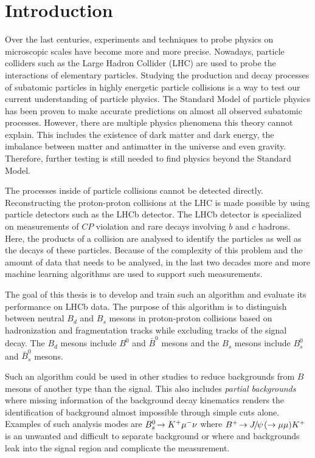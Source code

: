 \chapter{Introduction}

Over the last centuries, experiments and techniques to probe physics on microscopic scales have become more and more precise.
Nowadays, particle colliders such as the Large Hadron Collider (LHC) are used to probe the interactions of elementary particles.
Studying the production and decay processes of subatomic particles in highly energetic particle collisions is a way to test our current understanding of particle physics.
The Standard Model of particle physics has been proven to make accurate predictions on almost all observed subatomic processes.
However, there are multiple physics phenomena this theory cannot explain.
This includes the existence of dark matter and dark energy, the imbalance between matter and antimatter in the universe and even gravity.
Therefore, further testing is still needed to find physics beyond the Standard Model.

The processes inside of particle collisions cannot be detected directly.
Reconstructing the proton-proton collisions at the LHC is made possible by using particle detectors such as the LHCb detector.
The LHCb detector is specialized on measurements of $C\!P$ violation and rare decays involving $b$ and $c$ hadrons.
Here, the products of a collision are analysed to identify the particles as well as the decays of these particles.
Because of the complexity of this problem and the amount of data that needs to be analysed, in the last two decades more and more machine learning algorithms are used to support such measurements.

The goal of this thesis is to develop and train such an algorithm and evaluate its performance on LHCb data.
The purpose of this algorithm is to distinguish between neutral $B_d$ and $B_s$ mesons in proton-proton collisions based on hadronization and fragmentation tracks while excluding tracks of the signal decay. The $B_d$ mesons include $B^0$ and $\bar{B}^0$ mesons and the $B_s$ mesons include $B_s^0$ and $\bar{B}_s^0$ mesons.

Such an algorithm could be used in other studies to reduce backgrounds from $B$ mesons of another type than the signal. 
This also includes \emph{partial backgrounds} where missing information of the background decay kinematics renders the identification of background almost impossible through simple cuts alone.
Examples of such analysis modes are $\mbox{\ensuremath{{{B}^0_{s}}\!\rightarrow {\ensuremath{{K}^+}}{\ensuremath{\mu^-}}{\ensuremath{\nu}}}}$ where $\mbox{\ensuremath{{{{B}^+}}\!\rightarrow {\ensuremath{{J\mskip -3mu/\mskip -2mu\psi\mskip 2mu}}}(\rightarrow{\ensuremath{\mu}}{\ensuremath{\mu}}){{K}^+}}}$ is an unwanted and difficult to separate background or \decay{\Bs}{\Dsp\Km} where \Bd and \Lb backgrounds leak into the signal region and complicate the measurement.



















